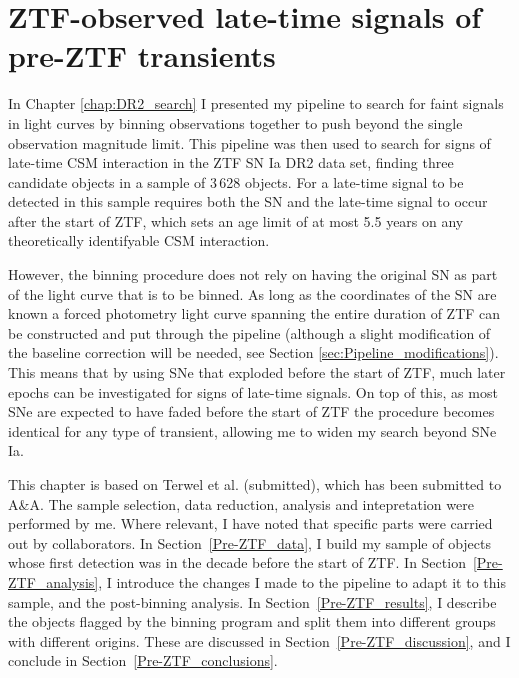 \documentclass[a4paper,oneside,12pt, class=Latex/Classes/PhDthesisPSnPDF, crop=false]{standalone}
\begin{document}
\doublespacing
\chapter{ZTF-observed late-time signals of pre-ZTF transients}
\label{chap:pre-ZTF_search}


In Chapter \ref{chap:DR2_search} I presented my pipeline to search for faint signals in light curves by binning observations together to push beyond the single observation magnitude limit. This pipeline was then used to search for signs of late-time CSM interaction in the ZTF SN Ia DR2 data set, finding three candidate objects in a sample of 3\,628 objects. For a late-time signal to be detected in this sample requires both the SN and the late-time signal to occur after the start of ZTF, which sets an age limit of at most 5.5 years on any theoretically identifyable CSM interaction.

However, the binning procedure does not rely on having the original SN as part of the light curve that is to be binned. As long as the coordinates of the SN are known a forced photometry light curve spanning the entire duration of ZTF can be constructed and put through the pipeline (although a slight modification of the baseline correction will be needed, see Section \ref{sec:Pipeline_modifications}). This means that by using SNe that exploded before the start of ZTF, much later epochs can be investigated for signs of late-time signals. On top of this, as most SNe are expected to have faded before the start of ZTF the procedure becomes identical for any type of transient, allowing me to widen my search beyond SNe Ia.

This chapter is based on Terwel et al. (submitted), which has been submitted to A\&A. The sample selection, data reduction, analysis and intepretation were performed by me. Where relevant, I have noted that specific parts were carried out by collaborators. In Section~\ref{Pre-ZTF_data}, I build my sample of objects whose first detection was in the decade before the start of ZTF. In Section~\ref{Pre-ZTF_analysis}, I introduce the changes I made to the pipeline to adapt it to this sample, and the post-binning analysis. In Section~\ref{Pre-ZTF_results}, I describe the objects flagged by the binning program and split them into different groups with different origins. These are discussed in Section~\ref{Pre-ZTF_discussion}, and I conclude in Section~\ref{Pre-ZTF_conclusions}.

\end{document}
